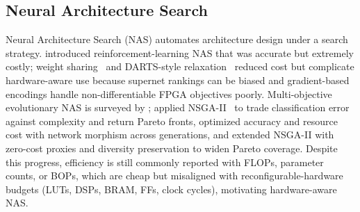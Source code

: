\documentclass[11pt]{article}
\begin{document}
\subsection{Neural Architecture Search}



Neural Architecture Search (NAS) automates architecture design under a search strategy.
\citet{zoph2016neural} introduced reinforcement-learning NAS that was accurate but extremely costly; weight sharing~\citep{pham2018efficient} and DARTS-style relaxation~\citep{liu2018darts} reduced cost but complicate hardware-aware use because supernet rankings can be biased and gradient-based encodings handle non-differentiable FPGA objectives poorly.
Multi-objective evolutionary NAS is surveyed by \citet{9508774}; \citet{lu2019nsga} applied NSGA-II~\citep{NSGA} to trade classification error against complexity and return Pareto fronts, \citet{elsken2018efficient} optimized accuracy and resource cost with network morphism across generations, and \citet{sinha2024multi} extended NSGA-II with zero-cost proxies and diversity preservation to widen Pareto coverage.
Despite this progress, efficiency is still commonly reported with FLOPs, parameter counts, or BOPs, which are cheap but misaligned with reconfigurable-hardware budgets (LUTs, DSPs, BRAM, FFs, clock cycles), motivating hardware-aware NAS.
\end{document}
